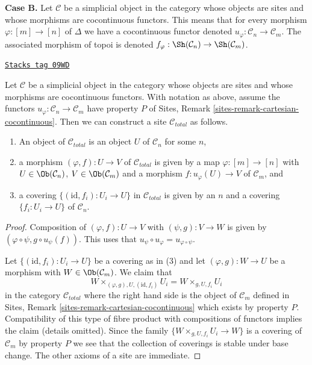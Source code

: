 {\bf Case B.}
Let $\mathcal{C}$ be a simplicial object in the category whose objects are
sites and whose morphisms are cocontinuous functors. This means that for
every morphism $\varphi : [m] \to [n]$ of $\Delta$ we have a cocontinuous
functor denoted $u_\varphi : \mathcal{C}_n \to \mathcal{C}_m$. The associated
morphism of topoi is denoted
$f_\varphi : \Sh(\mathcal{C}_n) \to \Sh(\mathcal{C}_m)$.

\begin{lemma}
\label{spaces-simplicial-lemma-simplicial-cocontinuous-site}
\href{https://stacks.math.columbia.edu/tag/09WD}{\texttt{Stacks tag 09WD}}

Let $\mathcal{C}$ be a simplicial object in the category whose objects are
sites and whose morphisms are cocontinuous functors. With notation as above,
assume the functors $u_\varphi : \mathcal{C}_n \to \mathcal{C}_m$
have property $P$ of Sites, Remark \ref{sites-remark-cartesian-cocontinuous}.
Then we can construct a site $\mathcal{C}_{total}$ as follows.
\begin{enumerate}
\item An object of $\mathcal{C}_{total}$ is an object $U$ of
$\mathcal{C}_n$ for some $n$,
\item a morphism $(\varphi, f) : U \to V$ of $\mathcal{C}_{total}$
is given by a map $\varphi : [m] \to [n]$ with
$U \in \Ob(\mathcal{C}_n)$, $V \in \Ob(\mathcal{C}_m)$
and a morphism $f : u_\varphi(U) \to V$ of $\mathcal{C}_m$, and
\item a covering $\{(\text{id}, f_i) :  U_i \to U\}$ in $\mathcal{C}_{total}$
is given by an $n$ and a covering $\{f_i : U_i \to U\}$
of $\mathcal{C}_n$.
\end{enumerate}
\end{lemma}

\begin{proof}
Composition of $(\varphi, f) : U \to V$ with $(\psi, g) : V \to W$
is given by $(\varphi \circ \psi, g \circ u_\psi(f))$.
This uses that $u_\psi \circ u_\varphi = u_{\varphi \circ \psi}$.

\medskip\noindent
Let $\{(\text{id}, f_i) :  U_i \to U\}$ be a covering as in (3)
and let $(\varphi, g) : W \to U$ be a morphism with
$W \in \Ob(\mathcal{C}_m)$. We claim that
$$
W \times_{(\varphi, g), U, (\text{id}, f_i)} U_i =
W \times_{g, U, f_i} U_i
$$
in the category $\mathcal{C}_{total}$ where the right hand side
is the object of $\mathcal{C}_m$ defined in
Sites, Remark \ref{sites-remark-cartesian-cocontinuous}
which exists by property $P$. Compatibility of this type of fibre product
with compositions of functors implies the claim (details omitted).
Since the family $\{W \times_{g, U, f_i} U_i \to W\}$ is a
covering of $\mathcal{C}_m$ by property $P$ we see that
the collection of coverings is stable under base
change. The other axioms of a site are immediate.
\end{proof}


